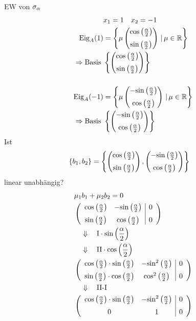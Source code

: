 EW von $\sigalph$
\begin{align*}
    &x_1 = 1 \quad x_2 = -1 \\
    \text{Eig}_A(1) &= \left\{\mu\begin{pmatrix}
        \cosah \\[2mm]
        \sinah
    \end{pmatrix}\,|\,\mu \in \mathbb{R}\right\} \\
    \Rightarrow \text{Basis }&\left\{\begin{pmatrix}
        \cosah \\[2mm]
        \sinah
    \end{pmatrix}\right\} \\[0.5cm]
    \text{Eig}_A(-1) &= \left\{\mu\begin{pmatrix}
        -\sinah \\[2mm]
        \cosah
    \end{pmatrix}\,|\,\mu \in \mathbb{R}\right\} \\
    \Rightarrow \text{Basis }&\left\{\begin{pmatrix}
        -\sinah \\[2mm]
        \cosah
    \end{pmatrix}\right\}
\end{align*}
Ist
\begin{align*}
    \{b_1, b_2\} &= \left\{\begin{pmatrix}
        \cosah \\[2mm]
        \sinah
    \end{pmatrix}, \begin{pmatrix}
        -\sinah \\[2mm]
        \cosah
    \end{pmatrix}\right\}
\end{align*}
linear unabhängig?
\begin{align*}
    &\mu _1 b_1 + \mu _2 b_2 = 0 \\
    &\left(\begin{array}{cc|c}
        \cosah & -\sinah & 0 \\[2mm]
        \sinah & \cosah & 0
    \end{array}\right) \\
    &\quad\Downarrow\quad\text{I}\cdot\sinah \\
    &\quad\Downarrow\quad\text{II}\cdot\cosah \\
    &\left(\begin{array}{cc|c}
		\cosah\cdot\sinah & -\text{sin}^2\left(\frac{\alpha}{2}\right) & 0 \\[2mm]
		\sinah\cdot\cosah & \text{cos}^2\left(\frac{\alpha}{2}\right) & 0
    \end{array}\right) \\
    &\quad\Downarrow\quad\text{II-I} \\
    &\left(\begin{array}{cc|c}
		\cosah\cdot\sinah & -\text{sin}^2\left(\frac{\alpha}{2}\right) & 0 \\[2mm]
		0 & 1 & 0
    \end{array}\right) \\
\end{align*}
